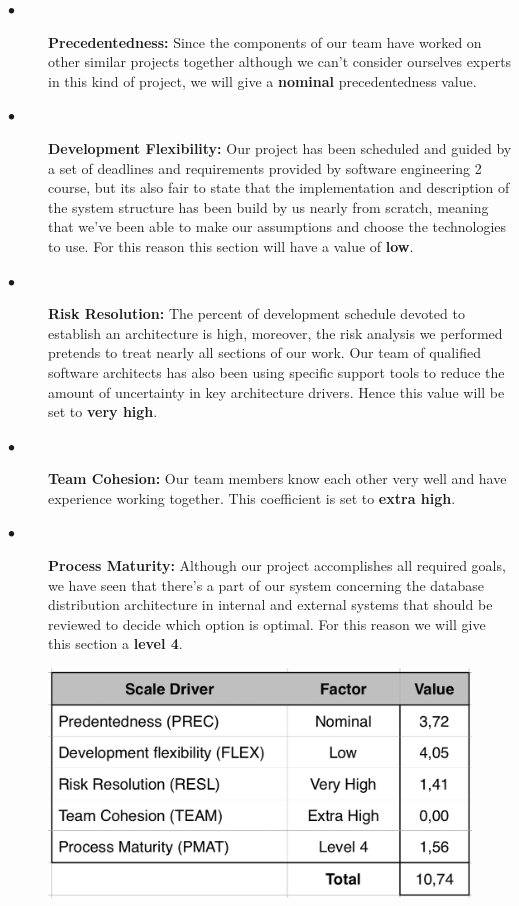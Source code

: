 \documentclass[a4paper,10pt]{article}
\begin{document}
   \begin{description}
    \item[$\bullet$] \textbf{Precedentedness:} Since the components of our team have worked on other similar projects together although we can’t consider ourselves experts in this kind of project, we will give a \textbf{nominal} precedentedness value.
    \item[$\bullet$] \textbf{Development Flexibility:} Our project has been scheduled and guided by a set of deadlines and requirements provided by software engineering 2 course, but its also fair to state that the implementation and description of the system structure has been build by us nearly from scratch, meaning that we’ve been able to make our assumptions and choose the technologies to use. For this reason this section will have a value of \textbf{low}.
    \item[$\bullet$] \textbf{Risk Resolution:} The percent of development schedule devoted to establish an architecture is high, moreover, the risk analysis we performed pretends to treat nearly all sections of our work.  Our team of qualified software architects has also been using specific support tools to reduce the amount of uncertainty in key architecture drivers. Hence this value will be set to \textbf{very high}. 
    \item[$\bullet$] \textbf{Team Cohesion:} Our team members know each other very well and have experience working together. This coefficient is set to \textbf{extra high}.
    \item[$\bullet$] \textbf{Process Maturity:} Although our project accomplishes all required goals, we have seen that there’s a part of our system concerning the database distribution architecture in internal and external systems that should be reviewed to decide which option is optimal. For this reason we will give this section a \textbf{level 4}.
  \end{description}
      \begin{figure}[h]
  \centering
    \includegraphics[scale=0.32]{Resources/cocomo/resume1.png}
  \end{figure}
  \FloatBarrier
\end{document}
